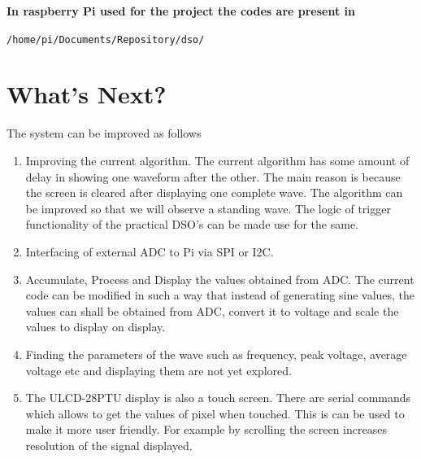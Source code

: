 \documentclass[12pt, a4paper, twoside]{article}
\begin{document}
\textbf{In raspberry Pi used for the project the codes are present in} 

\texttt{/home/pi/Documents/Repository/dso/}

\section{What's Next?}
	The system can be improved as follows
\begin{enumerate}
	\item Improving the current algorithm. The current algorithm has some amount of delay in showing one waveform after the other. The main reason is because the screen is cleared after displaying one complete wave. The algorithm can be improved so that we will observe a standing wave. The logic of trigger functionality of the practical DSO's can be made use for the same. 
	\item Interfacing of external ADC to Pi via SPI or I2C.
	\item Accumulate, Process and Display the values obtained from ADC. The current code can be modified in such a way that instead of generating sine values, the values can shall be obtained from ADC, convert it to voltage and scale the values to display on display.
	\item Finding the parameters of the wave such as frequency, peak voltage, average voltage etc and displaying them are not yet explored. 
	\item The ULCD-28PTU display is also a touch screen. There are serial commands which allows to get the values of pixel when touched. This is can be used to make it more user friendly. For example by scrolling the screen increases resolution of the signal displayed.
\end{enumerate}



 
\end{document}
